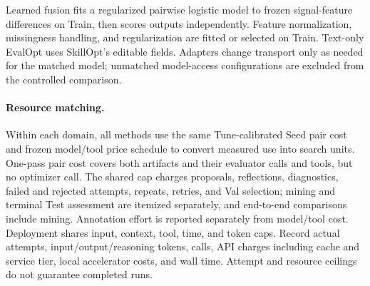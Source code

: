 Learned fusion fits a regularized pairwise logistic model to frozen signal-feature differences on Train, then scores outputs independently.
Feature normalization, missingness handling, and regularization are fitted or selected on Train.
Text-only EvalOpt uses SkillOpt's editable fields.
Adapters change transport only as needed for the matched model; unmatched model-access configurations are excluded from the controlled comparison.

\paragraph{Resource matching.}
Within each domain, all methods use the same Tune-calibrated Seed pair cost and frozen model/tool price schedule to convert measured use into search units.
One-pass pair cost covers both artifacts and their evaluator calls and tools, but no optimizer call.
The shared cap charges proposals, reflections, diagnostics, failed and rejected attempts, repeats, retries, and Val selection; mining and terminal Test assessment are itemized separately, and end-to-end comparisons include mining.
Annotation effort is reported separately from model/tool cost.
Deployment shares input, context, tool, time, and token caps.
Record actual attempts, input/output/reasoning tokens, calls, API charges including cache and service tier, local accelerator costs, and wall time.
Attempt and resource ceilings do not guarantee completed runs.

